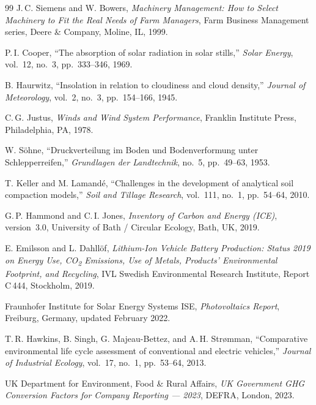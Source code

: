\documentclass[11pt,a4paper]{article}
\begin{document}
\begin{thebibliography}{99}
J.\,C. Siemens and W. Bowers,
\emph{Machinery Management: How to Select Machinery to Fit the Real Needs of Farm Managers},
Farm Business Management series, Deere \& Company, Moline, IL, 1999.

P.\,I. Cooper,
``The absorption of solar radiation in solar stills,''
\emph{Solar Energy}, vol.~12, no.~3, pp.~333--346, 1969.

B. Haurwitz,
``Insolation in relation to cloudiness and cloud density,''
\emph{Journal of Meteorology}, vol.~2, no.~3, pp.~154--166, 1945.

C.\,G. Justus,
\emph{Winds and Wind System Performance},
Franklin Institute Press, Philadelphia, PA, 1978.

W. S\"ohne,
``Druckverteilung im Boden und Bodenverformung unter Schlepperreifen,''
\emph{Grundlagen der Landtechnik}, no.~5, pp.~49--63, 1953.

T. Keller and M. Lamand\'e,
``Challenges in the development of analytical soil compaction models,''
\emph{Soil and Tillage Research}, vol.~111, no.~1, pp.~54--64, 2010.

G.\,P. Hammond and C.\,I. Jones,
\emph{Inventory of Carbon and Energy (ICE)}, version~3.0,
University of Bath / Circular Ecology, Bath, UK, 2019.

E. Emilsson and L. Dahll\"of,
\emph{Lithium-Ion Vehicle Battery Production: Status 2019 on Energy Use, CO\textsubscript{2} Emissions, Use of Metals, Products' Environmental Footprint, and Recycling},
IVL Swedish Environmental Research Institute, Report C\,444, Stockholm, 2019.

Fraunhofer Institute for Solar Energy Systems ISE,
\emph{Photovoltaics Report},
Freiburg, Germany, updated February 2022.

T.\,R. Hawkins, B. Singh, G. Majeau-Bettez, and A.\,H. Str{\o}mman,
``Comparative environmental life cycle assessment of conventional and electric vehicles,''
\emph{Journal of Industrial Ecology}, vol.~17, no.~1, pp.~53--64, 2013.

UK Department for Environment, Food \& Rural Affairs,
\emph{UK Government GHG Conversion Factors for Company Reporting --- 2023},
DEFRA, London, 2023.


\end{thebibliography}
\end{document}
